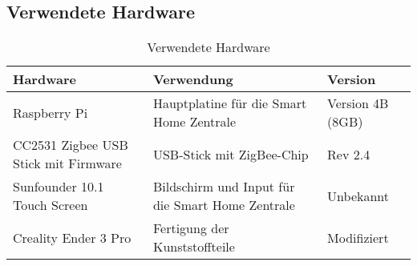 \subsection{Verwendete Hardware}\label{qu_hardware}
\begin{table}[H]
\begin{tabularx}{\textwidth}{|p{5cm}|p{6cm}|p{3.2cm}|}
    	\hline
 	    \textbf{Hardware} & \textbf{Verwendung} & \textbf{Version} \\
    	\hline
    	Raspberry Pi & Hauptplatine für die Smart Home Zentrale & Version 4B (8GB)\\
 	    \hline
 	    CC2531 Zigbee USB Stick mit Firmware & USB-Stick mit ZigBee-Chip & Rev 2.4\\
    	\hline
    	Sunfounder 10.1 Touch Screen  & Bildschirm und Input für die Smart Home Zentrale & Unbekannt\\
 	    \hline
 	    Creality Ender 3 Pro & Fertigung der Kunststoffteile & Modifiziert\\
 	    \hline
    \end{tabularx}
    \caption{Verwendete Hardware}
    \label{tab:qu_hardware}
\end{table}
